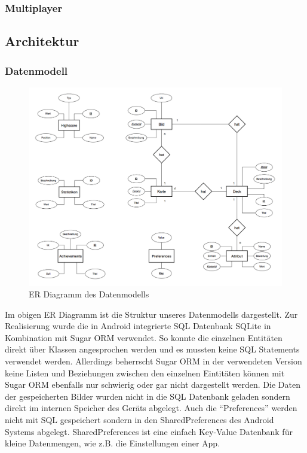 \documentclass{scrartcl}
\begin{document}
\subsubsection{Multiplayer}
\subsection{Architektur}
\subsubsection{Datenmodell}

\begin{figure}[h]
  \centering
  \includegraphics[width=\textwidth]{img/map_er.png}
  \caption{ER Diagramm des Datenmodells}
\end{figure}

\noindent
Im obigen ER Diagramm ist die Struktur unseres Datenmodells dargestellt. Zur
Realisierung wurde die in Android integrierte SQL Datenbank SQLite in
Kombination mit Sugar ORM verwendet. So konnte die einzelnen Entitäten direkt
über Klassen angesprochen werden und es mussten keine SQL Statements verwendet
werden. Allerdings beherrscht Sugar ORM in der verwendeten Version keine Listen
und Beziehungen zwischen den einzelnen Eintitäten können mit Sugar ORM ebenfalls
nur schwierig oder gar nicht dargestellt werden. Die Daten der gespeicherten
Bilder wurden nicht in die SQL Datenbank geladen sondern direkt im internen
Speicher des Geräts abgelegt. Auch die \enquote{Preferences} werden nicht mit
SQL gespeichert sondern in den SharedPreferences des Android Systems abgelegt.
SharedPreferences ist eine einfach Key-Value Datenbank für kleine Datenmengen,
wie z.B. die Einstellungen einer App.
\end{document}
